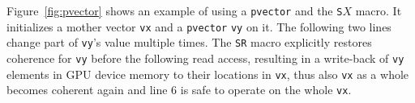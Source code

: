 Figure~\ref{fig:pvector}
shows an example of using a \texttt{pvector} and the 
\texttt{S$X$} macro.
It initializes a mother vector \texttt{vx}
and a \texttt{pvector} \texttt{vy} on it.
The following two lines change part of \texttt{vy}'s value multiple times. %
The \texttt{SR} macro explicitly restores coherence for
\texttt{vy} before the following read access, 
resulting in a write-back of \texttt{vy} elements in GPU device memory
to their locations in \texttt{vx},
thus also \texttt{vx} as a whole becomes coherent again
and line 6 is safe to operate on the whole \texttt{vx}.




